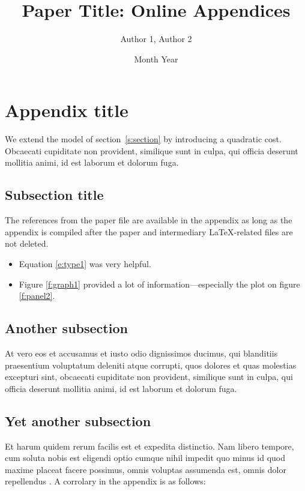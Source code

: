 \documentclass[letterpaper,12pt,leqno]{article}
\begin{document}
\title{Paper Title: Online Appendices}
\author{Author 1, Author 2}
\date{Month Year}
\begin{titlepage}
\maketitle
\tableofcontents
\end{titlepage}


\section{Appendix title}\label{a:appendix1}

We extend the model of section~\ref{s:section} by introducing a quadratic cost. Obcaecati cupiditate non provident, similique sunt in culpa, qui officia deserunt mollitia animi, id est laborum et dolorum fuga. 

\subsection{Subsection title} 

The references from the paper file are available in the appendix as long as the appendix is compiled after the paper and intermediary LaTeX-related files are not deleted.

\begin{itemize}    
    \item Equation \ref{e:type1} was very helpful.
    \item Figure \ref{f:graph1} provided a lot of information---especially the plot on figure \ref{f:panel2}. 
\end{itemize}  

\subsection{Another subsection}

At vero eos et accusamus et iusto odio dignissimos ducimus, qui blanditiis praesentium voluptatum deleniti atque corrupti, quos dolores et quas molestias excepturi sint, obcaecati cupiditate non provident, similique sunt in culpa, qui officia deserunt mollitia animi, id est laborum et dolorum fuga. 

\subsection{Yet another subsection}

Et harum quidem rerum facilis est et expedita distinctio. Nam libero tempore, cum soluta nobis est eligendi optio cumque nihil impedit quo minus id quod maxime placeat facere possimus, omnis voluptas assumenda est, omnis dolor repellendus \citep{MS22a}. A corrolary in the appendix is as follows:
\end{document}
